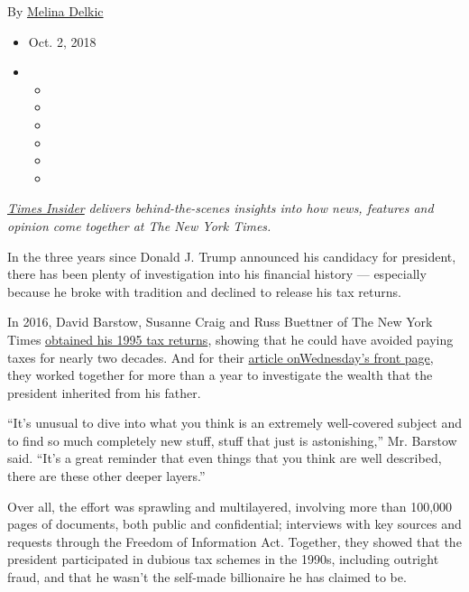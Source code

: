 By \href{https://www.nytimes.com/by/melina-delkic}{Melina Delkic}

\begin{itemize}
\item
  Oct. 2, 2018
\item
  \begin{itemize}
  \item
  \item
  \item
  \item
  \item
  \item
  \end{itemize}
\end{itemize}

\href{http://www.nytimes.com/section/insider}{\emph{Times Insider}}
\emph{delivers behind-the-scenes insights into how news, features and
opinion come together at The New York Times.}

In the three years since Donald J. Trump announced his candidacy for
president, there has been plenty of investigation into his financial
history --- especially because he broke with tradition and declined to
release his tax returns.

In 2016, David Barstow, Susanne Craig and Russ Buettner of The New York
Times
\href{https://www.nytimes.com/2016/10/02/us/politics/donald-trump-taxes.html}{obtained
his 1995 tax returns}, showing that he could have avoided paying taxes
for nearly two decades. And for their
\href{https://www.nytimes.com/interactive/2018/10/02/us/politics/donald-trump-tax-schemes-fred-trump.html}{article
on}\href{https://www.nytimes.com/interactive/2018/10/02/us/politics/donald-trump-tax-schemes-fred-trump.html}{Wednesday's
front page}, they worked together for more than a year to investigate
the wealth that the president inherited from his father.

``It's unusual to dive into what you think is an extremely well-covered
subject and to find so much completely new stuff, stuff that just is
astonishing,'' Mr. Barstow said. ``It's a great reminder that even
things that you think are well described, there are these other deeper
layers.''

Over all, the effort was sprawling and multilayered, involving more than
100,000 pages of documents, both public and confidential; interviews
with key sources and requests through the Freedom of Information Act.
Together, they showed that the president participated in dubious tax
schemes in the 1990s, including outright fraud, and that he wasn't the
self-made billionaire he has claimed to be.

